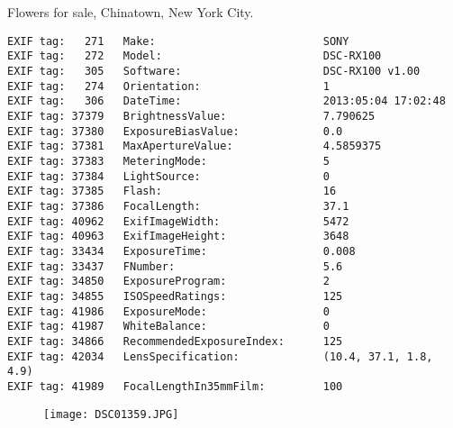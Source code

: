 \section{\protect{}}
\noindent Flowers for sale, Chinatown, New York City.
\noindent
\begin{lstlisting}
EXIF tag:   271   Make:                          SONY
EXIF tag:   272   Model:                         DSC-RX100
EXIF tag:   305   Software:                      DSC-RX100 v1.00
EXIF tag:   274   Orientation:                   1
EXIF tag:   306   DateTime:                      2013:05:04 17:02:48
EXIF tag: 37379   BrightnessValue:               7.790625
EXIF tag: 37380   ExposureBiasValue:             0.0
EXIF tag: 37381   MaxApertureValue:              4.5859375
EXIF tag: 37383   MeteringMode:                  5
EXIF tag: 37384   LightSource:                   0
EXIF tag: 37385   Flash:                         16
EXIF tag: 37386   FocalLength:                   37.1
EXIF tag: 40962   ExifImageWidth:                5472
EXIF tag: 40963   ExifImageHeight:               3648
EXIF tag: 33434   ExposureTime:                  0.008
EXIF tag: 33437   FNumber:                       5.6
EXIF tag: 34850   ExposureProgram:               2
EXIF tag: 34855   ISOSpeedRatings:               125
EXIF tag: 41986   ExposureMode:                  0
EXIF tag: 41987   WhiteBalance:                  0
EXIF tag: 34866   RecommendedExposureIndex:      125
EXIF tag: 42034   LensSpecification:             (10.4, 37.1, 1.8, 4.9)
EXIF tag: 41989   FocalLengthIn35mmFilm:         100

\end{lstlisting}
\clearpage
\begin{figure}
\raggedleft
\texttt{[image: DSC01359.JPG]}
\end{figure}


\clearpage
